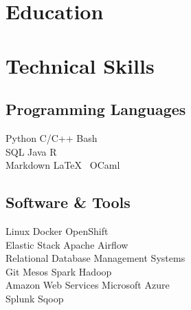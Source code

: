 \documentclass[]{deedy-resume-openfont}
\begin{document}

\section{Education}
\sectionsep


\section{Technical Skills}
\begin{minipage}[t]{.6\textwidth}
\subsection{Programming Languages}
Python \textbullet{}   C/C++ \textbullet{} Bash \\
SQL \textbullet{} Java \textbullet{} R \\
Markdown \textbullet{} \LaTeX\ \textbullet{} OCaml \\
\sectionsep
\end{minipage}
\hfill
\begin{minipage}[t]{.35\textwidth}
\subsection{Software \& Tools}
Linux \textbullet{} Docker \textbullet{} OpenShift\\
Elastic Stack \textbullet{} Apache Airflow\\
Relational Database Management Systems\\
Git \textbullet{} Mesos \textbullet{} Spark \textbullet{} Hadoop\\
Amazon Web Services \textbullet{} Microsoft Azure\\
Splunk  \textbullet{} Sqoop\\
\end{minipage}
\end{document}
